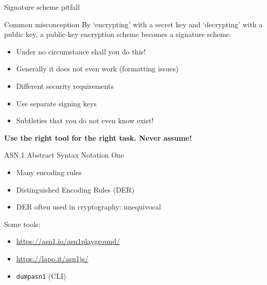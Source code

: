 \begin{frame}{Signature scheme pitfall}
  \pause
  \begin{block}{Common misconception}
    By `encrypting' with a secret key and `decrypting' with a public key, a public-key encryption scheme becomes a signature scheme.
  \end{block}

  \begin{itemize}[<+(1)->]
    \item Under no circumstance shall you do this!
    \item Generally it does not even work (formatting issues)
    \item Different security requirements
    \item Use separate signing keys
    \item Subtleties that you do not even know exist!
  \end{itemize}

  \pause
  \textbf{Use the right tool for the right task. Never assume!}
\end{frame}

\begin{frame}{ASN.1}
  Abstract Syntax Notation One
  \begin{itemize}[<+(1)->]
    \item Many encoding rules
    \item Distinguished Encoding Rules (DER)
    \item DER often used in cryptography: unequivocal
  \end{itemize}

  \pause
  Some tools:
  \begin{itemize}[<+(1)->]
    \item \url{https://asn1.io/asn1playground/}
    \item \url{https://lapo.it/asn1js/}
    \item \texttt{dumpasn1} (CLI)
  \end{itemize}
\end{frame}


